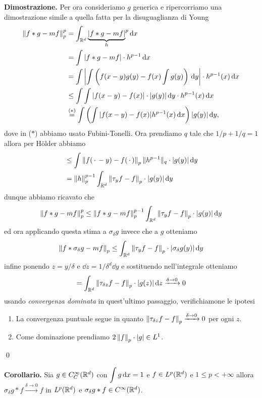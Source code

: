 \textbf{Dimostrazione.}
Per ora consideriamo $g$ generica e ripercorriamo una dimostrazione simile a quella fatta per la disuguaglianza di Young
$$
\begin{aligned}
	\left\lVert f \ast g - m f \right\rVert_p^p 
	&= \int_{\mathbb R^d} {\underbrace{|f \ast g - m f|}_h}^p \,\mathrm{d} x \\
	&= \int |f \ast g - m f| \cdot h^{p-1} \,\mathrm{d} x \\
	&= \int \left| \int \left( f(x - y) g(y) - f(x) \int g(y) \right) \,\mathrm{d} y \right| \cdot h^{p-1}(x) \,\mathrm{d} x \\
	&\leq \int \int |f(x - y) - f(x)| \cdot |g(y)| \,\mathrm{d} y \cdot h^{p-1}(x) \,\mathrm{d} x \\
	&\overset{\text{($*$)}}{=} \int \left(\int |f(x - y) - f(x)| h^{p-1}(x) \,\mathrm{d} x \right) |g(y)| \,\mathrm{d} y,
\end{aligned}
$$
dove in ($*$) abbiamo usato Fubini-Tonelli. Ora prendiamo $q$ tale che $1/p + 1/q = 1$ allora per H\"older abbiamo
$$
\begin{aligned}
	&\leq \int \left\lVert f(\,\cdot\, - y) - f(\,\cdot\,) \right\rVert_p \| h^{p-1} \|_q \cdot |g(y)| \,\mathrm{d} y \\
	&= \left\lVert h \right\rVert_p^{p-1} \int_{\mathbb R^d} \left\lVert \tau_y f - f \right\rVert_p \cdot |g(y)| \,\mathrm{d} y \\
\end{aligned}
$$
dunque abbiamo ricavato che
$$
\left\lVert f \ast g - m f \right\rVert_p^p 
\leq \left\lVert f \ast g - m f \right\rVert_p^{p-1} \int_{\mathbb R^d} \left\lVert \tau_y f - f \right\rVert_p \cdot |g(y)| \,\mathrm{d} y
$$
ed ora applicando questa stima a $\sigma_\delta g$ invece che a $g$ otteniamo
$$
\left\lVert f \ast \sigma_\delta g - m f \right\rVert_p
\leq \int_{\mathbb R^d} \left\lVert \tau_y f - f \right\rVert_p \cdot |\sigma_\delta g(y)| \,\mathrm{d} y
$$
infine ponendo $z = y / \delta$ e $\dd z = 1/\delta^d \dd y$ e sostituendo nell'integrale otteniamo
$$
= \int_{\mathbb R^d} \left\lVert \tau_{\delta z} f - f \right\rVert_p \cdot |g(z)| \,\mathrm{d} z \xrightarrow{\delta \to 0} 0
$$
usando \textit{convergenza dominata} in quest'ultimo passaggio, verifichiamone le ipotesi
\begin{enumerate}
	\item La convergenza puntuale segue in quanto $\left\lVert \tau_{\delta z} f - f \right\rVert_p \xrightarrow{\delta \to 0} 0$ per ogni $z$.
	\item Come dominazione prendiamo $2 \left\lVert f \right\rVert_p \cdot |g| \in L^1$.
\end{enumerate}
\qed

\textbf{Corollario.}
Sia $g \in C_C^\infty(\mathbb R^d)$ con $\displaystyle \int g \,\mathrm{d} x = 1$ e $f \in L^p(\mathbb R^d)$ e $1 \leq p < +\infty$ allora $\sigma_\delta g \ast f \xrightarrow{\delta \to 0} f$ in $L^p(\mathbb R^d)$ e $\sigma_\delta g \ast f \in C^\infty(\mathbb R^d)$.

